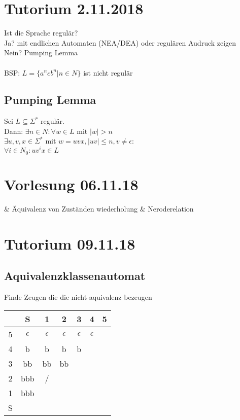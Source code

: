 \documentclass[a4paper]{scrartcl}
\begin{document}
	
	\section{Tutorium 2.11.2018}
		Ist die Sprache regulär? \\
		Ja? mit endlichen Automaten (NEA/DEA) oder regulären Audruck zeigen\\
		Nein? Pumping Lemma\\
		\\
		BSP: \( L = \{ a^n c b^n | n \in N \} \) ist nicht regulär
		
		\subsection{Pumping Lemma}
			Sei \( L \subseteq \Sigma^* \) regulär. \\
			Dann: \( \exists n \in N : \forall w \in L \text{ mit } |w| > n \)\\
			\( \exists u,v, x \in \Sigma^* \) mit \( w = uvx, |uv| \leq n, v \neq \epsilon : \) \\
			\( \forall i \in N_0 : uv^i x \in L \)
	
	\section{Vorlesung 06.11.18}
		\begin{easylist}
			& Äquivalenz von Zuständen wiederholung
			& Neroderelation 
		\end{easylist}
	
	\section{Tutorium 09.11.18}
	
		\subsection{Aquivalenzklassenautomat}
		Finde Zeugen die die nicht-aquivalenz bezeugen
	
		\begin{tabular}{|c|c|c|c|c|c|c|}
			\hline 
			& S & 1 & 2 & 3 & 4 & 5 \\ 
			\hline 
			5 & \(\epsilon\) & \(\epsilon\) & \(\epsilon\) & \(\epsilon\) & \(\epsilon\) &  \\ 
			\hline 
			4 & b & b & b & b &  &  \\ 
			\hline 
			3 & bb & bb & bb &  &  &  \\ 
			\hline 
			2 & bbb & / &  &  &  &  \\ 
			\hline 
			1 & bbb &  &  &  &  &  \\ 
			\hline 
			S &  &  &  &  &  &  \\ 
			\hline 
		\end{tabular} 
	
\end{document}
